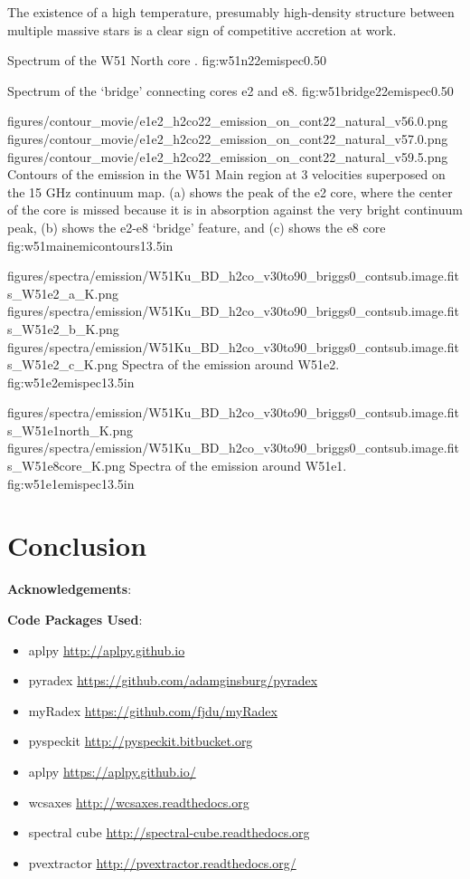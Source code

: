 The existence of a high temperature, presumably high-density structure between
multiple massive stars is a clear sign of competitive accretion at work.

{Spectrum of the W51 North core \citep{Zapata2008a,Zapata2009a,Zapata2010a}.}
{fig:w51n22emispec}{0.5}{0}

{Spectrum of the `bridge' connecting cores e2 and e8.}
{fig:w51bridge22emispec}{0.5}{0}

\FigureThreeAA
{figures/contour_movie/e1e2_h2co22_emission_on_cont22_natural_v56.0.png}
{figures/contour_movie/e1e2_h2co22_emission_on_cont22_natural_v57.0.png}
{figures/contour_movie/e1e2_h2co22_emission_on_cont22_natural_v59.5.png}
{Contours of the \formaldehyde \twotwo emission in the W51 Main region at 3
velocities superposed on the 15 GHz continuum map.  (a) shows the peak of the e2
core, where the center of the core is missed because it is in absorption
against the very bright continuum peak, (b) shows the e2-e8 `bridge' feature,
and (c) shows the e8 core}
{fig:w51mainemicontours}{1}{3.5in}

\FigureThreeAA
{figures/spectra/emission/W51Ku_BD_h2co_v30to90_briggs0_contsub.image.fits_W51e2_a_K.png}
{figures/spectra/emission/W51Ku_BD_h2co_v30to90_briggs0_contsub.image.fits_W51e2_b_K.png}
{figures/spectra/emission/W51Ku_BD_h2co_v30to90_briggs0_contsub.image.fits_W51e2_c_K.png}
{Spectra of the \twotwo emission around W51e2.}
{fig:w51e2emispec}{1}{3.5in}

\FigureTwoAA
{figures/spectra/emission/W51Ku_BD_h2co_v30to90_briggs0_contsub.image.fits_W51e1north_K.png}
{figures/spectra/emission/W51Ku_BD_h2co_v30to90_briggs0_contsub.image.fits_W51e8core_K.png}
{Spectra of the \twotwo emission around W51e1.}
{fig:w51e1emispec}{1}{3.5in}

\section{Conclusion}

\textbf{Acknowledgements}:

\textbf{Code Packages Used}:

\begin{itemize}
    \item aplpy \url{http://aplpy.github.io}
    \item pyradex \url{https://github.com/adamginsburg/pyradex}
    \item myRadex \url{https://github.com/fjdu/myRadex}
    \item pyspeckit \url{http://pyspeckit.bitbucket.org}
    \item aplpy \url{https://aplpy.github.io/}
    \item wcsaxes \url{http://wcsaxes.readthedocs.org}
    \item spectral cube \url{http://spectral-cube.readthedocs.org}
    \item pvextractor \url{http://pvextractor.readthedocs.org/}
\end{itemize}




